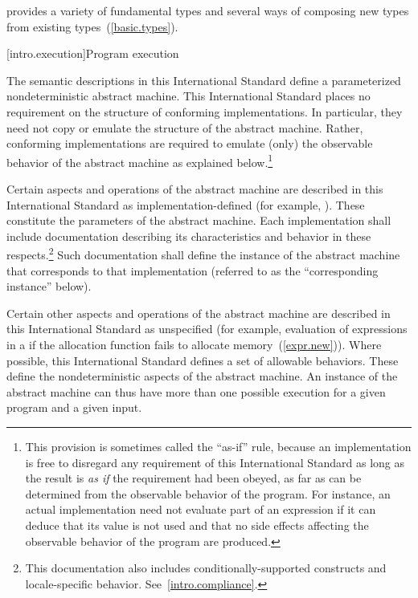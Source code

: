 \pnum
\begin{note} 
\Cpp  provides a variety of fundamental types and several ways of composing
new types from existing types~(\ref{basic.types}).
\end{note}%

[intro.execution]{Program execution}

\pnum
{}%
%
The semantic descriptions in this International Standard define a
parameterized nondeterministic abstract machine. This International
Standard places no requirement on the structure of conforming
implementations. In particular, they need not copy or emulate the
structure of the abstract machine.
%
%
Rather, conforming implementations are required to emulate (only) the observable
behavior of the abstract machine as explained below.\footnote{This provision is
sometimes called the ``as-if'' rule, because an implementation is free to
disregard any requirement of this International Standard as long as the result
is \emph{as if} the requirement had been obeyed, as far as can be determined
from the observable behavior of the program. For instance, an actual
implementation need not evaluate part of an expression if it can deduce that its
value is not used and that no
%
side effects affecting the
observable behavior of the program are produced.}

%
\pnum
Certain aspects and operations of the abstract machine are described in this
International Standard as implementation-defined (for example,
). These constitute the parameters of the abstract machine.
Each implementation shall include documentation describing its characteristics
and behavior in these respects.\footnote{This documentation also includes
conditionally-supported constructs and locale-specific behavior.
See~\ref{intro.compliance}.} Such documentation shall define the instance of the
abstract machine that corresponds to that implementation (referred to as the
``corresponding instance'' below).

%
\pnum
Certain other aspects and operations of the abstract machine are
described in this International Standard as unspecified (for example,
evaluation of expressions in a  if the allocation
function fails to allocate memory~(\ref{expr.new})). Where possible, this
International Standard defines a set of allowable behaviors. These
define the nondeterministic aspects of the abstract machine. An instance
of the abstract machine can thus have more than one possible execution
for a given program and a given input.

